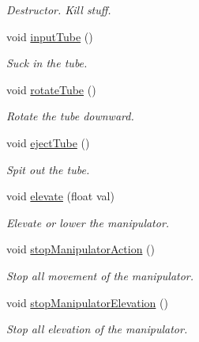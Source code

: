 \begin{DoxyCompactItemize}
\begin{DoxyCompactList}\small\item\em Destructor. Kill stuff. \item\end{DoxyCompactList}\item 
void \hyperlink{class_r_j_f_r_c2011_1_1_manipulator_a46b06044e8821d6df6d7d57b8c82b1fc}{inputTube} ()
\begin{DoxyCompactList}\small\item\em Suck in the tube. \item\end{DoxyCompactList}\item 
void \hyperlink{class_r_j_f_r_c2011_1_1_manipulator_a315e58939a97c9a0516bab7a92161a1e}{rotateTube} ()
\begin{DoxyCompactList}\small\item\em Rotate the tube downward. \item\end{DoxyCompactList}\item 
void \hyperlink{class_r_j_f_r_c2011_1_1_manipulator_aa2aad5b415a79d3cbf2d416e7dd4d6b4}{ejectTube} ()
\begin{DoxyCompactList}\small\item\em Spit out the tube. \item\end{DoxyCompactList}\item 
void \hyperlink{class_r_j_f_r_c2011_1_1_manipulator_ab5c4959ca6900ef7332713158d5567b6}{elevate} (float val)
\begin{DoxyCompactList}\small\item\em Elevate or lower the manipulator. \item\end{DoxyCompactList}\item 
void \hyperlink{class_r_j_f_r_c2011_1_1_manipulator_a1f643a0a143871d0f0b123ea0f273bd7}{stopManipulatorAction} ()
\begin{DoxyCompactList}\small\item\em Stop all movement of the manipulator. \item\end{DoxyCompactList}\item 
void \hyperlink{class_r_j_f_r_c2011_1_1_manipulator_a086407a628311ecab83795fbc6fcfee6}{stopManipulatorElevation} ()
\begin{DoxyCompactList}\small\item\em Stop all elevation of the manipulator. \item\end{DoxyCompactList}\item 

\end{DoxyCompactItemize}

